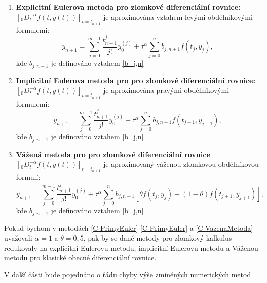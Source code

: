 \documentclass[a4paper,12pt,twoside]{article}
\theoremstyle{definition}
\theoremstyle{remark}
\numberwithin{equation}{section}
\numberwithin{table}{section}
\numberwithin{figure}{section}
\begin{document}
\begin{enumerate}[label=(\textbf{\arabic*})]
	\item \textbf{Explicitní Eulerova metoda pro zlomkové diferenciální rovnice:}
	$\left[_{0}D_{t}^{-\alpha} f\left(t,y\left(t\right)\right)\right]_{t=t_{n+1}}$ je aproximována vztahem levými obdélníkovými formulemi:
		\begin{equation} \label{C-PrimyEuler}
			y_{n+1} = \sum_{j=0}^{m-1} \frac{t_{n+1}^{j}}{j!} y_{0}^{(j)} + \tau^{\alpha} \sum_{j = 0}^{n} b_{j,n+1} f\left(t_{j}, y_{j}\right),
		\end{equation}
	kde $b_{j, n+1}$ je definováno vztahem \eqref{b_j,n} \cite{Cangpin}
	
	\item \textbf{Implicitní Eulerova metoda pro pro zlomkové diferenciální rovnice:}
		$\left[_{0}D_{t}^{-\alpha} f\left(t,y\left(t\right)\right)\right]_{t=t_{n+1}}$ je aproximována pravými obdélníkovými formulemi:
		\begin{equation} \label{C-NeprimyEuler}
			y_{n+1} = \sum_{j=0}^{m-1} \frac{t_{n+1}^{j}}{j!} y_{0}^{(j)} + \tau^{\alpha} \sum_{j = 0}^{n} 	b_{j,n+1} f\left(t_{j+1}, y_{j+1}\right),
		\end{equation}
	kde $b_{j, n+1}$ je definováno vztahem \eqref{b_j,n} \cite{Cangpin}
	
	\item \textbf{Vážená metoda pro pro zlomkové diferenciální rovnice} %
			$\left[_{0}D_{t}^{-\alpha} f\left(t,y\left(t\right)\right)\right]_{t=t_{n+1}}$ je aproximovaný váženou zlomkovou obdélníkovou formulí:
		\begin{equation} \label{C-VazenaMetoda}
			y_{n+1} = \sum_{j=0}^{m-1} \frac{t_{n+1}^{j}}{j!} y_{0}^{(j)} + \tau^{\alpha} \sum_{j = 0}^{n} 	b_{j,n+1} \left[\theta f\left(t_{j}, y_{j}\right) + \left(1-\theta \right)f \left(t_{j+1}, y_{j+1}\right)\right],
		\end{equation}
		kde $b_{j, n+1}$ je definováno vztahem \eqref{b_j,n}		\cite{Cangpin}
\end{enumerate}

Pokud bychom v metodách \eqref{C-PrimyEuler} \eqref{C-PrimyEuler} a \eqref{C-VazenaMetoda} uvažovali $\alpha = 1$ a $\theta = 0,5$, pak by se dané metody pro zlomkový kalkulus redukovaly na explicitní Eulerovu metodu, implicitní Eulerovu metodu a Váženou metodu pro klasické obecné diferenciální rovnice.

V další části bude pojednáno o řádu chyby výše zmíněných numerických metod
\end{document}
